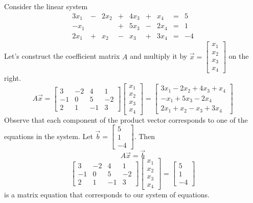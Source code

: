 \documentclass{ximera}
\begin{document}
\begin{exploration}\label{init:matrixmultsyseq}
Consider the linear system
$$\begin{array}{ccccccccc}
      3x_1 &- &2x_2&+&4x_3&+&x_4&= &5 \\
	 -x_1& &&+&5x_3&-&2x_4&=&1\\
     2x_1& +&x_2&-&x_3&+&3x_4&=&-4   
    \end{array}$$
Let's construct the coefficient matrix $A$ and multiply it by $\vec{x}=\begin{bmatrix}x_1\\x_2\\x_3\\x_4\end{bmatrix}$ on the right.  
$$A\vec{x}=\begin{bmatrix}3&-2&4&1\\-1&0&5&-2\\2&1&-1&3\end{bmatrix}\begin{bmatrix}x_1\\x_2\\x_3\\x_4\end{bmatrix}=\begin{bmatrix}3x_1-2x_2+4x_3+x_4\\-x_1+5x_3-2x_4\\2x_1+x_2-x_3+3x_4\end{bmatrix}$$
Observe that each component of the product vector corresponds to one of the equations in the system.  Let $\vec{b}=\begin{bmatrix}5\\1\\-4\end{bmatrix}$.  Then 
$$A\vec{x}=\vec{b}$$
$$\begin{bmatrix}3&-2&4&1\\-1&0&5&-2\\2&1&-1&3\end{bmatrix}\begin{bmatrix}x_1\\x_2\\x_3\\x_4\end{bmatrix}=\begin{bmatrix}5\\1\\-4\end{bmatrix}$$
is a matrix equation that corresponds to our system of equations.

\end{exploration}
\end{document}
